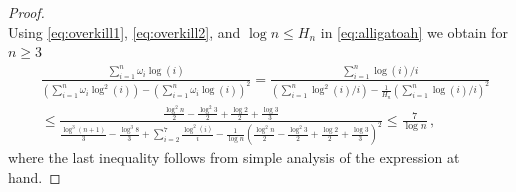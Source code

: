 \documentclass[a4paper]{scrartcl}
\numberwithin{equation}{section}
\begin{document}
\begin{proof}
\begin{equation}
    \end{equation}
    Using \eqref{eq:overkill1}, \eqref{eq:overkill2}, and $\log n\le H_n$ in \eqref{eq:alligatoah} we obtain for $n\ge 3$
    \begin{align*}
        &\frac{\sum_{i=1}^{n}\omega_i \log(i)}{(\sum_{i=1}^{n}\omega_i \log^2(i)) - (\sum_{i=1}^{n}\omega_i \log(i))^2}
        = \frac{\sum_{i=1}^{n}\log(i)/i}{(\sum_{i=1}^{n} \log^2(i)/i) - \frac{1}{H_n}(\sum_{i=1}^{n} \log(i)/i)^2} \\
        &\le \frac{\frac{\log^2 n}{2} - \frac{\log^2 3}{2} + \frac{\log 2}{2} + \frac{\log 3}{3}}{\frac{\log^3 (n+1)}{3} - \frac{\log^3 8}{3} + \sum_{i=2}^{7}\frac{\log^2 (i)}{i} - \frac{1}{\log n}(\frac{\log^2 n}{2} - \frac{\log^2 3}{2} + \frac{\log 2}{2} + \frac{\log 3}{3})^2}
        \le \frac{7}{\log n} \,,
    \end{align*}
    where the last inequality follows from simple analysis of the expression at hand.


\end{proof}
\end{document}
